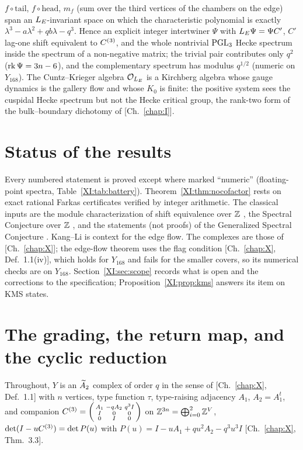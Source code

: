 \begin{chapterabstract}
$f\circ\text{tail}$, $f\circ\text{head}$, $m_f$ (sum over the third vertices of the chambers on
the edge) span an $L_E$-invariant space on which the characteristic polynomial is exactly
$\lambda^{3}-a\lambda^{2}+qb\lambda-q^{3}$. Hence an explicit integer intertwiner $\Psi$ with
$L_E\Psi=\Psi C'$, $C'$ lag-one shift equivalent to $C^{(3)}$, and the whole nontrivial
$\mathrm{PGL}_3$ Hecke spectrum inside the spectrum of a non-negative matrix; the trivial pair
contributes only $q^{2}$ ($\operatorname{rk}\Psi=3n-6$), and the complementary spectrum has modulus
$q^{1/2}$ (numeric on $Y_{168}$). The Cuntz--Krieger algebra $\mathcal{O}_{L_E}$ is a Kirchberg
algebra whose gauge dynamics is the gallery flow and whose $K_0$ is finite: the positive
system sees the cuspidal Hecke spectrum but not the Hecke critical group, the rank-two form
of the bulk--boundary dichotomy of [Ch.~\ref{chap:I}].
\end{chapterabstract}

\section*{Status of the results}

Every numbered statement is proved except where marked ``numeric'' (floating-point spectra,
Table~\ref{XI:tab:battery}). Theorem~\ref{XI:thm:nocofactor} rests on exact rational Farkas
certificates verified by integer arithmetic. The classical inputs are the module
characterization of shift equivalence over $\mathbb{Z}$ \cite[\S2]{BS}, the Spectral Conjecture over
$\mathbb{Z}$ \cite{KOR}, and the statements (not proofs) of the Generalized Spectral Conjecture
\cite{BH91,BH93,BS}. Kang--Li \cite{KL} is context for the edge flow. The complexes are those
of [Ch.~\ref{chap:X}]; the edge-flow theorem uses the flag condition [Ch.~\ref{chap:X}, Def.~1.1(iv)], which holds for
$Y_{168}$ and fails for the smaller covers, so its numerical checks are on $Y_{168}$.
Section~\ref{XI:sec:scope} records what is open and the corrections to the specification;
Proposition~\ref{XI:prop:kms} answers its item on KMS states.

\section{The grading, the return map, and the cyclic reduction}\label{XI:sec:grading}

Throughout, $Y$ is an $\widetilde A_2$ complex of order $q$ in the sense of [Ch.~\ref{chap:X}, Def.~1.1] with $n$
vertices, type function $\tau$, type-raising adjacency $A_1$, $A_2=A_1^{t}$, and companion
$C^{(3)}=\begin{psmallmatrix}A_1&-qA_2&q^{3}I\\ I&0&0\\0&I&0\end{psmallmatrix}$ on
$\mathbb{Z}^{3n}=\bigoplus_{i=0}^{2}\mathbb{Z}^{V}$, $\det(I-uC^{(3)})=\det P(u)$ with
$P(u)=I-uA_1+qu^{2}A_2-q^{3}u^{3}I$ [Ch.~\ref{chap:X}, Thm.~3.3].

